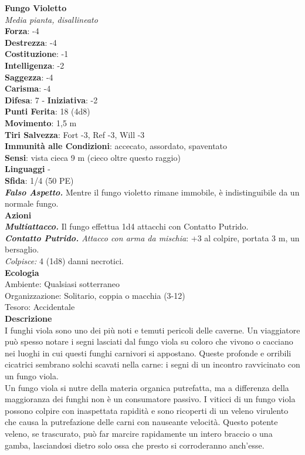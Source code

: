 \begin{multicols}{2}
\medskip\textbf{Fungo Violetto}\\
\emph{Media pianta, disallineato}\\
\textbf{Forza}: -4\\
\textbf{Destrezza}: -4\\
\textbf{Costituzione}: -1\\
\textbf{Intelligenza}: -2\\
\textbf{Saggezza}: -4\\
\textbf{Carisma}: -4\\
\textbf{Difesa}: 7 - \textbf{Iniziativa}: -2\\
\textbf{Punti Ferita}: 18 (4d8)\\
\textbf{Movimento}: 1,5 m\\
\textbf{Tiri Salvezza}: Fort -3, Ref -3, Will -3\\
\textbf{Immunità alle Condizioni}: accecato, assordato, spaventato\\
\textbf{Sensi}: vista cieca 9 m (cieco oltre questo raggio)\\
\textbf{Linguaggi} -\\
\textbf{Sfida}: 1/4 (50 PE)\smallskip\\
\emph{\textbf{Falso Aspetto.}} Mentre il fungo violetto rimane immobile, è indistinguibile da un normale fungo.\\
\smallskip\textbf{Azioni}\\
\emph{\textbf{Multiattacco.}} Il fungo effettua 1d4 attacchi con Contatto Putrido.\\
\emph{\textbf{Contatto Putrido.} Attacco con arma da mischia}: +3 al colpire, portata 3 m, un bersaglio.\\
\emph{Colpisce:} 4 (1d8) danni necrotici.\\
\textbf{Ecologia}\\
Ambiente: Qualsiasi sotterraneo\\
Organizzazione: Solitario, coppia o macchia (3-12)\\
Tesoro: Accidentale\\
\textbf{Descrizione}\\
I funghi viola sono uno dei più noti e temuti pericoli delle caverne. Un viaggiatore può spesso notare i segni lasciati dal fungo viola su coloro che vivono o cacciano nei luoghi in cui questi funghi carnivori si appostano. Queste profonde e orribili cicatrici sembrano solchi scavati nella carne: i segni di un incontro ravvicinato con un fungo viola.\\
Un fungo viola si nutre della materia organica putrefatta, ma a differenza della maggioranza dei funghi non è un consumatore passivo. I viticci di un fungo viola possono colpire con inaspettata rapidità e sono ricoperti di un veleno virulento che causa la putrefazione delle carni con nauseante velocità. Questo potente veleno, se trascurato, può far marcire rapidamente un intero braccio o una gamba, lasciandosi dietro solo ossa che presto si corroderanno anch’esse.\\

\end{multicols}
